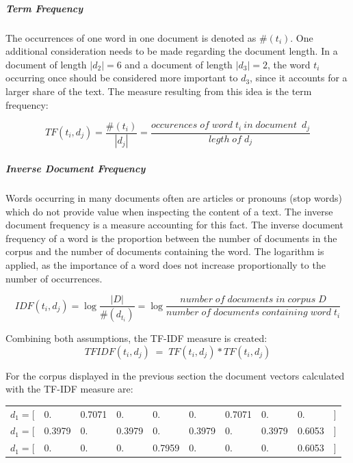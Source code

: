             \subparagraph{Term Frequency}
            The occurrences of one word in one document is denoted as $ \#( t_{i}) $.
            One additional consideration needs to be made regarding the document length. In a document of length $ |d_{2}| = 6 $ and a document of length  $ |d_{3}| = 2 $, the word $ t_{i} $occurring once should be considered more important to $ d_{3} $, since it accounts for a larger share of the text. The measure resulting from this idea is the term frequency:
            
            \[ TF(t_{i}, d_{j}) =   \dfrac{\#( t_{i})}{|d_{j}|} = \dfrac{occurences \; of \; word \; t_{i} \: in \; document \;\:   d_{j}}{legth \; of \; d_{j}} \]
            
            \subparagraph{Inverse Document Frequency}
            Words occurring in many documents often are articles or pronouns (stop words) which do not provide value when inspecting the content of a text. The inverse document frequency is a measure accounting for this fact. The inverse document frequency of a word is the proportion between the number of documents in the corpus and the number of documents containing the word. The logarithm is applied, as the importance of a word does not increase proportionally to the number of occurrences.
        
            \[ IDF(t_{i}, d_{j}) = \log \dfrac{|D|}{\#(d_{t_{i}}) } =  \log \dfrac{number \;  of\;  documents \;  in \; corpus \; D}{ number \; of \; documents \; containing \; word \; t_{i}} \]
            
            Combining both assumptions, the \ac{TF-IDF} measure is created:
             \[ TFIDF(t_{i}, d_{j}) \;=\; TF(t_{i}, d_{j}) * TF(t_{i}, d_{j})\]
            
            For the corpus displayed in the previous section the document vectors calculated with the \ac{TF-IDF} measure are:

           \begin{table}[!h]
           	\centering
           	\begin{tabular}{llllllllll}
           		$d_1 = [$ & 0.     & 0.7071 & 0.     & 0.     & 0.     & 0.7071 & 0.     & 0.     & $]$ \\
           		$d_1 = [$ & 0.3979 & 0.     & 0.3979 & 0.     & 0.3979 & 0.     & 0.3979 & 0.6053 & $]$ \\
           		$d_1 = [$ & 0.     & 0.     & 0.     & 0.7959 & 0.     & 0.     & 0.     & 0.6053 & $]$
           	\end{tabular}
           \end{table}
                
